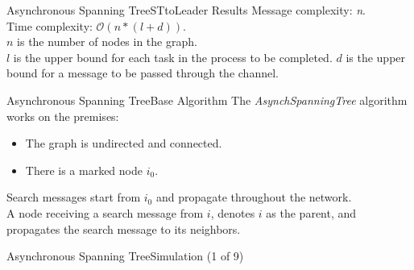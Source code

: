 \documentclass[pdf]{beamer}
\begin{document}
\begin{frame}{Asynchronous Spanning Tree}{STtoLeader Results}
    Message complexity: \emph{n}.\\
    Time complexity: $\mathcal{O}(n*(l+d))$.\\
    \vspace{12pt}
    $n$ is the number of nodes in the graph.\\
    $l$ is the upper bound for each task in the process to be completed.
    $d$ is the upper bound for a message to be passed through the channel.
\end{frame}

\begin{frame}{Asynchronous Spanning Tree}{Base Algorithm}
    The \emph{AsynchSpanningTree} algorithm works on the premises:
    \begin{itemize}
        \item{The graph is undirected and connected.}
        \pause
        \item{There is a marked node $i_0$.}
    \end{itemize}
    \vspace{12pt}
    \pause
    Search messages start from $i_0$ and propagate throughout the network.\\
    \pause
    \vspace{12pt}
    A node receiving a search message from $i$, denotes $i$ as the parent, and
    propagates the search message to its neighbors.
\end{frame}

\begin{frame}{Asynchronous Spanning Tree}{Simulation (1 of 9)}
\end{frame}
\end{document}
